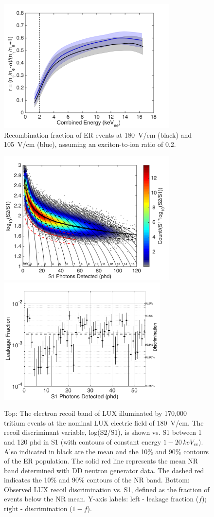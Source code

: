 \begin{figure}[h!]
\includegraphics[width=90mm]{fig/recombination.png}
\caption{Recombination fraction of ER events at 180~V/cm (black) and 105~V/cm (blue), assuming an exciton-to-ion ratio of 0.2.}
\label{fig:recombination}
\end{figure}

\begin{figure}[h!]
\includegraphics[width=90mm]{fig/CH3T_ER_Band.png}
\includegraphics[width=85mm]{fig/CH3T_Leakage_Run03.png}
\caption{Top: The electron recoil band of LUX illuminated by 170,000 tritium events at the nominal LUX electric field of 180~V/cm.  The recoil discriminant variable, log(S2/S1), is shown vs. S1 between 1 and 120 phd in S1 (with contours of constant energy $1-20 \, keV_{ee}$). Also indicated in black are the mean and the 10\% and 90\% contours of the ER population. The solid red line represents the mean NR band determined with DD neutron generator data. The dashed red indicates the 10\% and 90\% contours of the NR band. Bottom: Observed LUX recoil discrimination vs. S1, defined as the fraction of events below the NR mean. Y-axis labels: left -  leakage fraction ($f$); right - discrimination ($1-f$).}
\label{fig:ER_band}
\end{figure}

